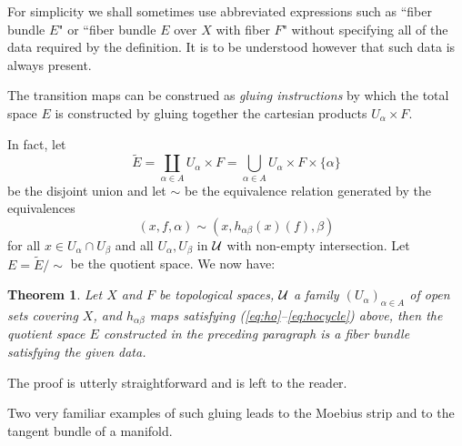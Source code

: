 \documentclass[12pt,titlepage]{article}
\def\cU{{\cal U}}
\newtheorem{theorem}{Theorem}
\begin{document}
For simplicity we shall sometimes use abbreviated expressions such as
``fiber bundle \(E\)" or ``fiber bundle \(E\) over \(X\) with fiber
\(F\)" without specifying all of the data required by the definition.
It is to be understood however that such data is always present.





The transition maps can be construed as {\em gluing instructions\/}
%
 by
which the total space \(E\) is constructed by gluing together
the cartesian products
\(U_\alpha  \times F\).

In fact, let  
\[
\tilde E = \coprod_{\alpha \in A }U_\alpha \times
F=\bigcup_{\alpha \in A}U_\alpha \times F\times\{\alpha \}
\]
 be the
disjoint union and let \(\sim\) be the equivalence relation
generated by the equivalences 
\begin{equation}\label{eq:glue}
(x,f,\alpha) \sim (x,
h_{\alpha\beta}(x)(f),\beta)
\end{equation}%
 for all \(x \in
U_\alpha \cap U_\beta \) and all \(U_\alpha ,U_\beta  \) in \(\cU \)
with non-empty intersection.
Let
\(E=\tilde
E / \sim\) be the quotient space.
We now have:
\begin{theorem}\label{th:glue}
Let \(X\) and \(F\) be topological spaces, \(\cU \) a family
\((U_\alpha)_{\alpha \in A}\) of  open sets covering
\(X\), and \(h_{\alpha\beta}\) maps satisfying
(\ref{eq:ho}--\ref{eq:hocycle})
above, then the quotient space \(E\) constructed in the preceding paragraph
is a
fiber bundle satisfying the given data.
\end{theorem}%
The proof is utterly straightforward and is left to the reader.

Two very familiar examples of such gluing leads to the Moebius strip 
and to the tangent bundle of a manifold. 
\end{document}
